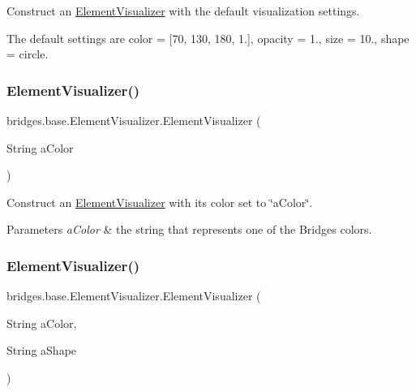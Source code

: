 Construct an \mbox{\hyperlink{classbridges_1_1base_1_1_element_visualizer}{Element\+Visualizer}} with the default visualization settings.

The default settings are color = \mbox{[}70, 130, 180, 1.\mbox{]}, opacity = 1., size = 10., shape = circle. \mbox{\label{classbridges_1_1base_1_1_element_visualizer_a5c0d9fe8051ebc816372b9836689fdfa}} 
\subsubsection{\texorpdfstring{ElementVisualizer()}{ElementVisualizer()}\hspace{0.1cm}{\footnotesize\ttfamily [2/6]}}
{\footnotesize\ttfamily bridges.\+base.\+Element\+Visualizer.\+Element\+Visualizer (\begin{DoxyParamCaption}\item[{String}]{a\+Color }\end{DoxyParamCaption})}

Construct an \mbox{\hyperlink{classbridges_1_1base_1_1_element_visualizer}{Element\+Visualizer}} with its color set to \char`\"{}a\+Color\char`\"{}.


\begin{DoxyParams}{Parameters}
{\em a\+Color} & the string that represents one of the Bridges colors. \\
\hline
\end{DoxyParams}
\mbox{\label{classbridges_1_1base_1_1_element_visualizer_ab62b1b06907fbeddfcee2b4b297e1021}} 
\subsubsection{\texorpdfstring{ElementVisualizer()}{ElementVisualizer()}\hspace{0.1cm}{\footnotesize\ttfamily [3/6]}}
{\footnotesize\ttfamily bridges.\+base.\+Element\+Visualizer.\+Element\+Visualizer (\begin{DoxyParamCaption}\item[{String}]{a\+Color,  }\item[{String}]{a\+Shape }\end{DoxyParamCaption})}

